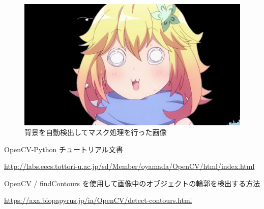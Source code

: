 \documentclass[dvipdfmx]{jsarticle}
\begin{document}
\begin{figure}[H]
  \centering
  \includegraphics[width=0.7\hsize]{../pic/tapu_bb.png}
  \caption{背景を自動検出してマスク処理を行った画像}
  \label{fig:masked}
\end{figure}

\begin{thebibliography}{10}
   OpenCV-Python チュートリアル文書

  \url{http://labs.eecs.tottori-u.ac.jp/sd/Member/oyamada/OpenCV/html/index.html}

   OpenCV / findContours を使用して画像中のオブジェクトの輪郭を検出する方法

  \url{https://axa.biopapyrus.jp/ia/OpenCV/detect-contours.html}
\end{thebibliography}
\end{document}
